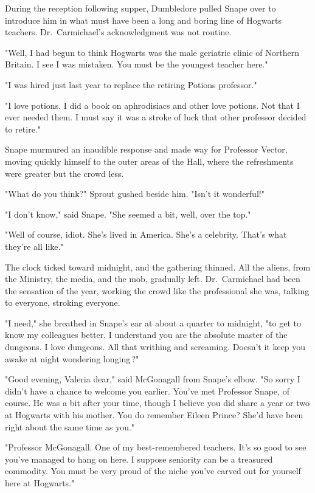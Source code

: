 During the reception following supper, Dumbledore pulled Snape over to introduce him in what must have been a long and boring line of Hogwarts teachers. Dr.~Carmichael's acknowledgment was not routine.

"Well, I had begun to think Hogwarts was the male geriatric clinic of Northern Britain. I see I was mistaken. You must be the youngest teacher here."

"I was hired just last year to replace the retiring Potions professor."

"I love potions. I did a book on aphrodisiacs and other love potions. Not that I ever needed them. I must say it was a stroke of luck that other professor decided to retire."

Snape murmured an inaudible response and made way for Professor Vector, moving quickly himself to the outer areas of the Hall, where the refreshments were greater but the crowd less.

"What do you think?" Sprout gushed beside him. "Isn't it wonderful!"

"I don't know," said Snape. "She seemed a bit, well, over the top."

"Well of course, idiot. She's lived in America. She's a celebrity. That's what they're all like."

The clock ticked toward midnight, and the gathering thinned. All the aliens, from the Ministry, the media, and the mob, gradually left. Dr.~Carmichael had been the sensation of the year, working the crowd like the professional she was, talking to everyone, stroking everyone.

"I need," she breathed in Snape's ear at about a quarter to midnight, "to get to know my colleagues better. I understand you are the absolute master of the dungeons. I love dungeons. All that writhing and screaming. Doesn't it keep you awake at night{\el} wondering{\el} longing{\el}\,?"

"Good evening, Valeria dear," said McGonagall from Snape's elbow. "So sorry I didn't have a chance to welcome you earlier. You've met Professor Snape, of course. He was a bit after your time, though I believe you did share a year or two at Hogwarts with his mother. You do remember Eileen Prince? She'd have been right about the same time as you."

"Professor McGonagall. One of my best-remembered teachers. It's so good to see you've managed to hang on here. I suppose seniority can be a treasured commodity. You must be very proud of the niche you've carved out for yourself here at Hogwarts."

